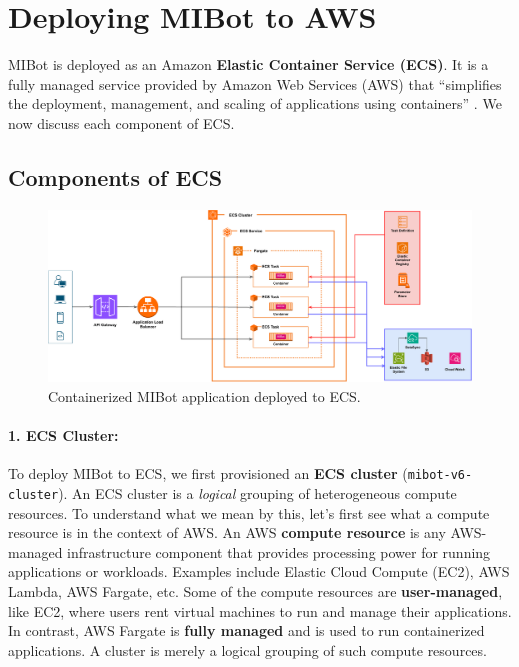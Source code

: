 \section{Deploying MIBot to AWS}
\label{sec:mibot-deplyment}

MIBot is deployed as an Amazon \textbf{Elastic Container Service (ECS)}. It is a fully managed service provided by Amazon Web Services (AWS) that ``simplifies the deployment, management, and scaling of applications using containers'' \cite{aws-ecs-getting-started}. We now discuss each component of ECS.

\subsection{Components of ECS}
\begin{figure}[ht]
  \centering
  \includegraphics[width=0.99\linewidth]{fig/deployment.drawio.pdf} 
  \caption{Containerized MIBot application deployed to ECS.}
  \label{fig:ecs-components}
\end{figure}

\paragraph{1. ECS Cluster:}To deploy MIBot to ECS, we first provisioned an \textbf{ECS cluster} (\texttt{mibot-v6-cluster}). An ECS cluster is a \textit{logical} grouping of heterogeneous compute resources. To understand what we mean by this, let's first see what a compute resource is in the context of AWS. An AWS \textbf{compute resource} is any AWS-managed infrastructure component that provides processing power for running applications or workloads. Examples include Elastic Cloud Compute (EC2), AWS Lambda, AWS Fargate, etc. Some of the compute resources are \textbf{user-managed}, like EC2, where users rent virtual machines to run and manage their applications. In contrast, AWS Fargate is \textbf{fully managed} and is used to run containerized applications. A cluster is merely a logical grouping of such compute resources.

